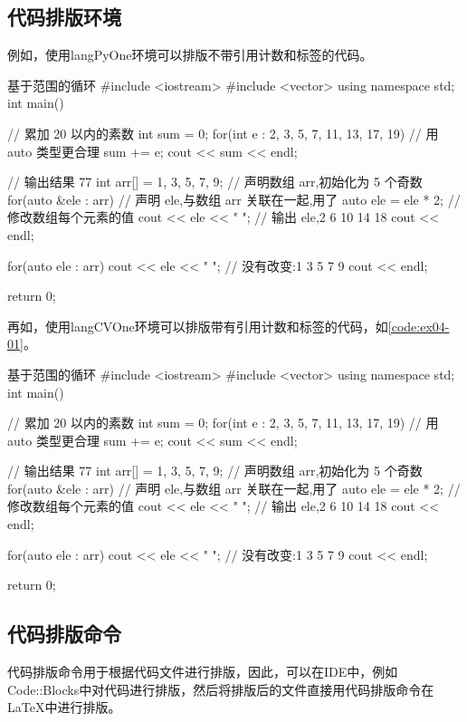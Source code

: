 \documentclass[
  ]{nwafuprojrep}
\begin{document}
\subsection{代码排版环境}
例如，使用langPyOne环境可以排版不带引用计数和标签的代码。
\begin{langPyOne}[C++]{基于范围的循环}
#include <iostream>
#include <vector>
using namespace std;
int main()
{
    // 累加 20 以内的素数
    int sum = 0;
    for(int e : {2, 3, 5, 7, 11, 13, 17, 19}) // 用 auto 类型更合理
    {
        sum += e;
    }
    cout << sum << endl;

    // 输出结果 77
    int arr[] = {1, 3, 5, 7, 9};
    // 声明数组 arr,初始化为 5 个奇数
    for(auto &ele : arr)
    {
        // 声明 ele,与数组 arr 关联在一起,用了 auto
        ele = ele * 2;
        // 修改数组每个元素的值
        cout << ele << " ";
        // 输出 ele,2 6 10 14 18
    }
    cout << endl;

    for(auto ele : arr)
    {
        cout << ele << " ";
    }
    // 没有改变:1 3 5 7 9
    cout << endl;

    return 0;
}  
\end{langPyOne}

再如，使用langCVOne环境可以排版带有引用计数和标签的代码，如\autoref{code:ex04-01}。
\begin{langCVOne}[C++][code:ex04-01][C++]{基于范围的循环}
#include <iostream>
#include <vector>
using namespace std;
int main()
{
    // 累加 20 以内的素数
    int sum = 0;
    for(int e : {2, 3, 5, 7, 11, 13, 17, 19}) // 用 auto 类型更合理
    {
        sum += e;
    }
    cout << sum << endl;

    // 输出结果 77
    int arr[] = {1, 3, 5, 7, 9};
    // 声明数组 arr,初始化为 5 个奇数
    for(auto &ele : arr)
    {
        // 声明 ele,与数组 arr 关联在一起,用了 auto
        ele = ele * 2;
        // 修改数组每个元素的值
        cout << ele << " ";
        // 输出 ele,2 6 10 14 18
    }
    cout << endl;

    for(auto ele : arr)
    {
        cout << ele << " ";
    }
    // 没有改变:1 3 5 7 9
    cout << endl;

    return 0;
}  
\end{langCVOne}

\subsection{代码排版命令}
代码排版命令用于根据代码文件进行排版，因此，可以在IDE中，例如
Code::Blocks中对代码进行排版，然后将排版后的文件直接用代码排版命令在
\LaTeX{}中进行排版。
\end{document}
